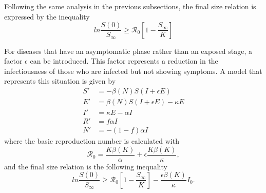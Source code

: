 Following the same analysis in the previous subsections, the final size relation is expressed by the inequality \cite{brauerCompartmentalModelsEpidemiology2008}
\begin{equation*}
    ln \frac{S(0)}{S_\infty} \geq \mathcal{R}_0 \left[ 1 - \frac{S_\infty}{K} \right]
\end{equation*}

For diseases that have an asymptomatic phase rather than an exposed stage, a factor $\epsilon$ can be introduced.
This factor represents a reduction in the infectiousness of those who are infected but not showing symptoms.
A model that represents this situation is given by \cite{brauerCompartmentalModelsEpidemiology2008}
\begin{align*}
    S' &= - \beta(N)S(I + \epsilon E) \\
    E' &= \beta(N)S(I + \epsilon E) - \kappa E \\
    I' &= \kappa E - \alpha I \\
    R' &= f \alpha I \\
    N' &= - (1 - f) \alpha I
\end{align*}
where the basic reproduction number is calculated with
\begin{equation*}
    \mathcal{R}_0 = \frac{K\beta(K)}{\alpha} + \epsilon\frac{K\beta(K)}{\kappa},
\end{equation*}
and the final size relation is the following inequality
\begin{equation*}
    ln \frac{S(0)}{S_\infty} \geq \mathcal{R}_0 \left[ 1 - \frac{S_\infty}{K} \right] - \frac{\epsilon\beta(K)}{\kappa}I_0.
\end{equation*}
